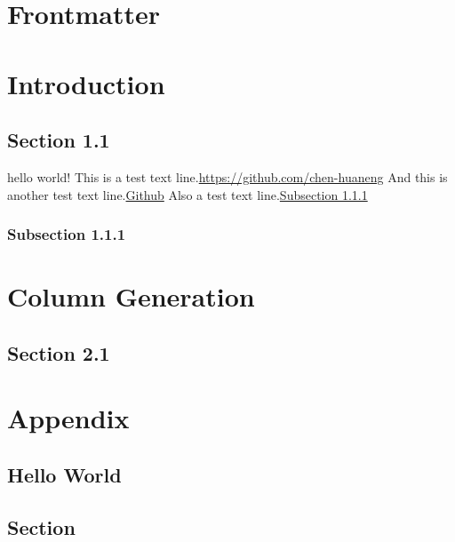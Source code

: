 \documentclass[10pt, a4paper, fontset=none, no-math]{ctexbook}
\begin{document}
\frontmatter

% 

\chapter{Frontmatter}
\lipsum[5-10]

\mainmatter

% 
% 
% 
% 
% 
% 

\chapter{Introduction}

\section{Section 1.1}

hello world!\cite{2015The} This is a test text line.\url{https://github.com/chen-huaneng} And this is another test text line.\href{https://github.com/chen-huaneng}{Github} Also a test text line.\hyperref[test]{Subsection 1.1.1}

\lipsum[5-10]

\subsection{Subsection 1.1.1}\label{test}

\lipsum[5-10]

\chapter{Column Generation}

\lipsum[5-10]

\section{Section 2.1}

\lipsum[5-10]

\backmatter

% 

\chapter*{Appendix}

\lipsum[5-10]

\section*{Hello World}

\lipsum[10-20]

\section{Section}

\lipsum[5-10]


\end{document}
